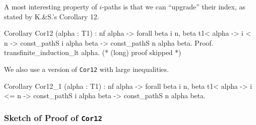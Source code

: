 








A most interesting property of $i$-paths is that we can ``upgrade'' their index, as stated by K.\&S.'s Corollary 12.


\begin{Coqsrc}
Corollary Cor12 (alpha : T1) :  nf alpha ->
         forall beta i n, beta  t1< alpha  ->
                i < n ->
                 const_pathS i alpha beta ->
                 const_pathS n alpha beta.
Proof.
  transfinite_induction_lt alpha.
  (* (long) proof skipped *)
\end{Coqsrc}

We  also use a version of \texttt{Cor12} with large inequalities.


\begin{Coqsrc}
Corollary Cor12_1 (alpha : T1) :
  nf alpha ->
  forall beta i n, beta t1< alpha ->
                   i <= n ->
                   const_pathS i alpha beta ->
                   const_pathS n alpha beta.
\end{Coqsrc}


\subsubsection{Sketch of Proof of \texttt{Cor12}}


